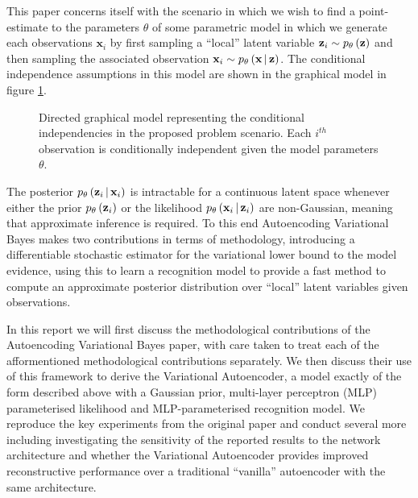 \documentclass[../report.tex]{subfiles}
\begin{document}
This paper concerns itself with the scenario in which we wish to find a point-estimate to the parameters $\theta$ of some parametric model in which we generate each observations $\mathbf{x}_i$ by first sampling a ``local'' latent variable $\mathbf{z}_i \sim p_\theta \left( \mathbf{z}\right)$ and then sampling the associated observation $\mathbf{x}_i \sim p_\theta \left(\mathbf{x} \, \middle\vert \, \mathbf{z} \right)$. The conditional independence assumptions in this model are shown in the graphical model in figure \ref{fig:graph}.

\begin{figure}[!htbp]
\centering
{}
\caption{\label{fig:graph}Directed graphical model representing the conditional independencies in the proposed problem scenario. Each $i^{th}$ observation is conditionally independent given the model parameters $\theta$.}
\end{figure}

The posterior $p_\theta \left(\mathbf{z}_i \, \middle\vert \, \mathbf{x}_i \right)$ is intractable for a continuous latent space whenever either the prior $p_\theta \left( \mathbf{z}_i\right)$ or the likelihood $p_\theta \left(\mathbf{x}_i \, \middle\vert \, \mathbf{z}_i \right)$ are non-Gaussian, meaning that approximate inference is required. To this end Autoencoding Variational Bayes makes two contributions in terms of methodology, introducing a differentiable stochastic estimator for the variational lower bound to the model evidence, using this to learn a recognition model to provide a fast method to compute an approximate posterior distribution over ``local'' latent variables given observations.

In this report we will first discuss the methodological contributions of the Autoencoding Variational Bayes paper, with care taken to treat each of the afformentioned methodological contributions separately. We then discuss their use of this framework to derive the Variational Autoencoder, a model exactly of the form described above with a Gaussian prior, multi-layer perceptron (MLP) parameterised likelihood and MLP-parameterised recognition model. We reproduce the key experiments from the original paper and conduct several more including investigating the sensitivity of the reported results to the network architecture and whether the Variational Autoencoder provides improved reconstructive performance over a traditional ``vanilla'' autoencoder with the same architecture.
\end{document}
